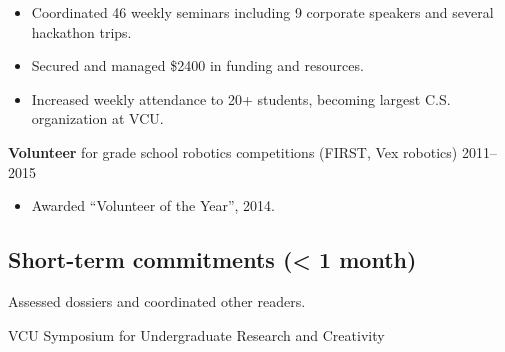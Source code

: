\documentclass[11pt,letterpaper,serif]{moderncv}
\begin{document}
{
	\begin{adjustwidth}{.25in}{}
		\begin{itemize}
			\item Coordinated 46 weekly seminars including 9 corporate speakers and several hackathon trips.
			\item Secured and managed \$2400 in funding and resources.
			\item Increased weekly attendance to 20+ students, becoming largest C.S. organization at VCU.
		\end{itemize}
	\end{adjustwidth}
}


{\textbf{Volunteer} for grade school robotics competitions (FIRST, Vex robotics)}
{2011--2015}{}
{
	\begin{adjustwidth}{.25in}{}
		\begin{itemize}
			\item Awarded ``Volunteer of the Year'', 2014.
		\end{itemize}
	\end{adjustwidth}
}


\smallskip
\subsection{Short-term commitments (< 1 month)}



{
	\begin{adjustwidth}{.25in}{}
		Assessed dossiers and coordinated other readers.
	\end{adjustwidth}
}

{
	\begin{adjustwidth}{.25in}{}
		VCU Symposium for Undergraduate Research and Creativity
	\end{adjustwidth}
}
\end{document}
